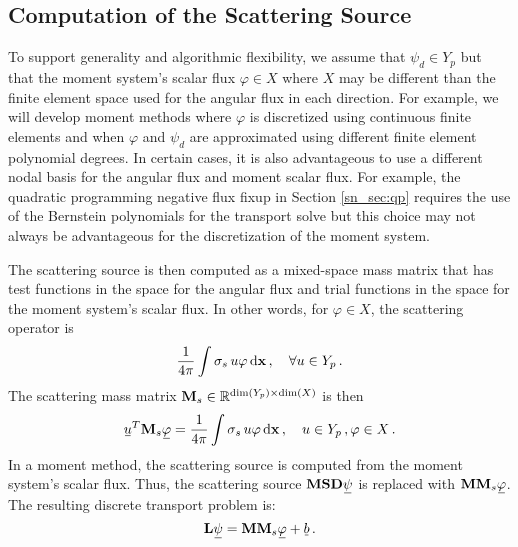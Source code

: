 \documentclass[../doc.tex]{subfiles}
\begin{document}
\subsection{Computation of the Scattering Source}
To support generality and algorithmic flexibility, we assume that $\psi_d \in Y_p$ but that the moment system's scalar flux $\varphi \in X$ where $X$ may be different than the finite element space used for the angular flux in each direction. For example, we will develop moment methods where $\varphi$ is discretized using continuous finite elements and when $\varphi$ and $\psi_d$ are approximated using different finite element polynomial degrees. In certain cases, it is also advantageous to use a different nodal basis for the angular flux and moment scalar flux. For example, the quadratic programming negative flux fixup in Section \ref{sn_sec:qp} requires the use of the Bernstein polynomials for the transport solve but this choice may not always be advantageous for the discretization of the moment system.

The scattering source is then computed as a mixed-space mass matrix that has test functions in the space for the angular flux and trial functions in the space for the moment system's scalar flux. In other words, for $\varphi \in X$, the scattering operator is 
	\begin{equation}
		\frac{1}{4\pi}\int \sigma_s\, u \varphi \mathop{}\!\mathrm{d} \boldsymbol{\mathrm{x}} \,, \quad \forall u \in Y_p \,. 		
	\end{equation}
The scattering mass matrix $\boldsymbol{\mathrm{M}}_s \in \mathbb{R}^{\dim(Y_p) \times \dim(X)}$ is then 
	\begin{equation}
		\ubar{u}^T\mat{M}_s \ubar{\varphi} = \frac{1}{4\pi}\int \sigma_s\, u\varphi \ud \x \,, \quad u \in Y_p \,, \varphi \in X \,. 
	\end{equation}
In a moment method, the scattering source is computed from the moment system's scalar flux. Thus, the scattering source $\mat{M}\mat{S}\mat{D}\ubar{\psi}$ is replaced with $\mat{M}\mat{M}_s\ubar{\varphi}$. The resulting discrete transport problem is: 
	\begin{equation}
		\mat{L}\ubar{\psi} = \mat{M}\mat{M}_s \ubar{\varphi} + \ubar{b} \,. 
	\end{equation}
\end{document}
